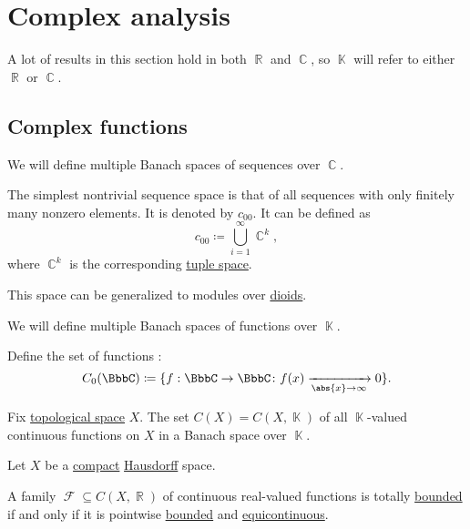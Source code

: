 \section{Complex analysis}\label{sec:complex_analysis}

A lot of results in this section hold in both \( \BbbR \) and \( \BbbC \), so \( \BbbK \) will refer to either \( \BbbR \) or \( \BbbC \).

\subsection{Complex functions}\label{subsec:complex_functions}

\begin{definition}\label{def:sequence_spaces}
  We will define multiple Banach spaces of sequences over \( \BbbC \).

  \begin{thmenum}
     The simplest nontrivial sequence space is that of all sequences with only finitely many nonzero elements. It is denoted by \( c_{00} \). It can be defined as
    \begin{equation*}
      c_{00} \coloneqq \bigcup_{i=1}^\infty \BbbC^k,
    \end{equation*}
    where \( \BbbC^k \) is the corresponding \hyperref[def:left_module_of_tuples]{tuple space}.

    This space can be generalized to modules over \hyperref[def:left_module]{dioids}.
  \end{thmenum}
\end{definition}

\begin{definition}\label{def:function_spaces}
  We will define multiple Banach spaces of functions over \( \BbbK \).

  \begin{thmenum}
     Define the set of functions :
    \begin{equation*}
      C_0(\BbbC) \coloneqq \{ f: \BbbC \to \BbbC \colon f(x) \xrightarrow[\abs{x} \to \infty]{} 0 \}.
    \end{equation*}

     Fix \hyperref[def:topological_space]{topological space} \( X \). The set \( C(X) = C(X, \BbbK) \) of all \( \BbbK \)-valued continuous functions on \( X \) in a Banach space over \( \BbbK \).
  \end{thmenum}
\end{definition}

\begin{theorem}\label{thm:arzela_ascoli}
  Let \( X \) be a \hyperref[def:compact_space]{compact} \hyperref[def:separation_axioms/T2]{Hausdorff} space.

  A family \( \mscrF \subseteq C(X, \BbbR) \) of continuous real-valued functions is totally \hyperref[def:totally_bounded_set]{bounded} if and only if it is pointwise \hyperref[def:bounded_function/pointwise]{bounded} and \hyperref[def:function_set_continuity/equicontinuous]{equicontinuous}.
\end{theorem}
